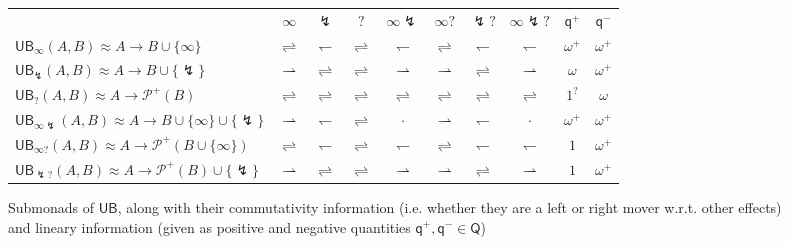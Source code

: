 \documentclass[acmsmall,screen,anonymous,review]{acmart}
\newcommand{\mc}[1]{\ensuremath{\mathcal{#1}}}
\newcommand{\ms}[1]{\ensuremath{\mathsf{#1}}}
\newcommand{\rightmove}{\rightharpoonup}
\newcommand{\leftmove}{\leftharpoondown}
\newcommand{\slides}{\rightleftharpoons}
\newcommand{\oneq}{1}
\newcommand{\delq}{1^?}
\newcommand{\cpyq}{\omega^+}
\newcommand{\topq}{\omega}
\newcommand{\ubeff}{\lightning}
\begin{document}
\begin{figure}
  \begin{adjustbox}{minipage=1.1\textwidth,scale=0.9}
  \centering
  \begin{tabular}{l|ccccccccc}
    & $\infty$ & $\ubeff$ & $?$ & $\infty\ubeff$ & $\infty?$ & $\ubeff?$ & $\infty\ubeff?$ 
    & $\ms{q}^+$ & $\ms{q}^-$ \\
    $\ms{UB}_\infty(A, B) \approx A \to B \cup \{\infty\}$ 
    & $\slides$ & $\leftmove$ & $\slides$ & $\leftmove$ & $\slides$ & $\leftmove$ & $\leftmove$ 
    & $\cpyq$ & $\cpyq$ \\ 
    $\ms{UB}_\ubeff(A, B) \approx A \to B \cup \{\ubeff\}$ 
    & $\rightmove$ & $\slides$ & $\slides$ & $\rightmove$ & $\rightmove$ & $\slides$ & $\rightmove$ 
    & $\topq$ & $\cpyq$ \\
    $\ms{UB}_?(A, B) \approx A \to \mc{P}^+(B)$
    & $\slides$ & $\slides$ & $\slides$ & $\slides$ & $\slides$ & $\slides$ & $\slides$ 
    & $\delq$ & $\topq$ \\
    $\ms{UB}_{\infty\ubeff}(A, B) \approx A \to B \cup \{\infty\} \cup \{\ubeff\}$ 
    & $\rightmove$ & $\leftmove$ & $\slides$ & $\cdot$ & $\rightmove$  & $\leftmove$ & $\cdot$ 
    & $\cpyq$ & $\cpyq$ \\
    $\ms{UB}_{\infty?}(A, B) \approx A \to \mc{P}^+(B \cup \{\infty\})$ 
    & $\slides$ & $\leftmove$ & $\slides$ & $\leftmove$ & $\slides$ & $\leftmove$ & $\leftmove$ 
    & $\oneq$ & $\cpyq$ \\ 
    $\ms{UB}_{\ubeff?}(A, B) \approx A \to \mc{P}^+(B) \cup \{\ubeff\}$ 
    & $\rightmove$ & $\slides$ & $\slides$ & $\rightmove$ & $\rightmove$ & $\slides$ & $\rightmove$ 
    & $\oneq$ & $\cpyq$ \\
  \end{tabular}
  \end{adjustbox}
  \caption{
    Submonads of $\ms{UB}$, along with their commutativity information 
    (i.e. whether they are a left or right mover w.r.t. other effects) and lineary information
    (given as positive and negative quantities $\ms{q}^+, \ms{q}^- \in \ms{Q}$)
  }
  \Description{}
  \label{fig:ub-submonads}
\end{figure}
\end{document}
